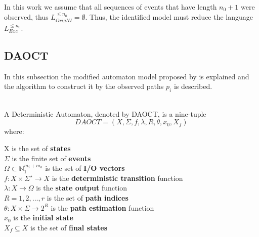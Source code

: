 In this work we assume that all
sequences of events that have length $n_0+1$ were observed, thus
$L_{OrigNI}^{\leq n_0}=\emptyset$.
Thus, the identified model must reduce the language $L_{Exc}^{\leq n_0}$.
\newpage
\subsection{DAOCT}
In this subsection the modified automaton model proposed by
\cite{moreira2018enhanced} is explained and the algorithm to construct it
by the observed paths $p_i$ is described. 
\begin{definition}[DAOCT]
  \label{def:daoct}~\\
  A Deterministic Automaton, denoted by DAOCT, is a nine-tuple
  \[ DAOCT = (X,\Sigma,f,\lambda,R,\theta, x_0,X_f)\] where:

  \indent X is the set of \textbf{states} \\
  \indent $\Sigma$ is the finite set of \textbf{events}\\
  \indent $\Omega \subset \mathbb{N}_1^{m_i+m_o} $ is the set of \textbf{I/O vectors}\\
  \indent $f:  X \times \Sigma^\star \rightarrow X$ is the \textbf{deterministic transition} function  \\
  \indent $\lambda : X \rightarrow \Omega$ is the \textbf{state output} function \\
  \indent $R = {1,2,\dots,r}$ is the set of \textbf{path indices} \\
  \indent $\theta : X \times \Sigma \rightarrow 2^R$ is the \textbf{path
    estimation} function \\
  \indent $x_0$ is the \textbf{initial state} \\
  \indent $X_f \subseteq X $ is the set of \textbf{final states}
\end{definition}

